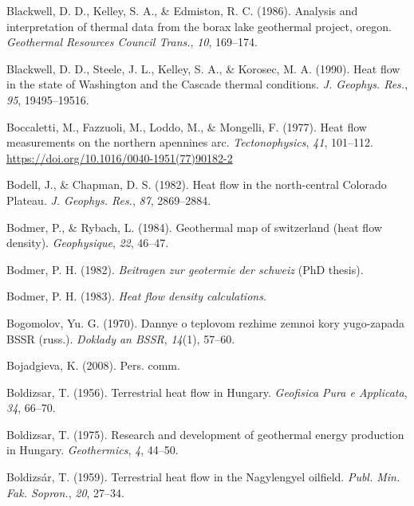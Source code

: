 \begin{CSLReferences}{1}{1}
\leavevmode{}%
Blackwell, D. D., Kelley, S. A., \& Edmiston, R. C. (1986). Analysis and interpretation of thermal data from the borax lake geothermal project, oregon. \emph{Geothermal Resources Council Trans.}, \emph{10}, 169--174.

\leavevmode{}%
Blackwell, D. D., Steele, J. L., Kelley, S. A., \& Korosec, M. A. (1990). Heat flow in the state of {Washington} and the {Cascade} thermal conditions. \emph{J. Geophys. Res.}, \emph{95}, 19495--19516.

\leavevmode{}%
Boccaletti, M., Fazzuoli, M., Loddo, M., \& Mongelli, F. (1977). Heat flow measurements on the northern apennines arc. \emph{Tectonophysics}, \emph{41}, 101--112. \url{https://doi.org/10.1016/0040-1951(77)90182-2}

\leavevmode{}%
Bodell, J., \& Chapman, D. S. (1982). Heat flow in the north-central {Colorado Plateau}. \emph{J. Geophys. Res.}, \emph{87}, 2869--2884.

\leavevmode{}%
Bodmer, P., \& Rybach, L. (1984). Geothermal map of switzerland (heat flow density). \emph{Geophysique}, \emph{22}, 46--47.

\leavevmode{}%
Bodmer, P. H. (1982). \emph{Beitragen zur geotermie der schweiz} (PhD thesis).

\leavevmode{}%
Bodmer, P. H. (1983). \emph{Heat flow density calculations}.

\leavevmode{}%
Bogomolov, Yu. G. (1970). Dannye o teplovom rezhime zemnoi kory yugo-zapada BSSR (russ.). \emph{Doklady an BSSR}, \emph{14}(1), 57--60.

\leavevmode{}%
Bojadgieva, K. (2008). Pers. comm.

\leavevmode{}%
Boldizsar, T. (1956). Terrestrial heat flow in {Hungary}. \emph{Geofisica Pura e Applicata}, \emph{34}, 66--70.

\leavevmode{}%
Boldizsar, T. (1975). Research and development of geothermal energy production in {Hungary}. \emph{Geothermics}, \emph{4}, 44--50.

\leavevmode{}%
Boldizsár, T. (1959). Terrestrial heat flow in the {Nagylengyel} oilfield. \emph{Publ. Min. Fak. Sopron.}, \emph{20}, 27--34.


\end{CSLReferences}
